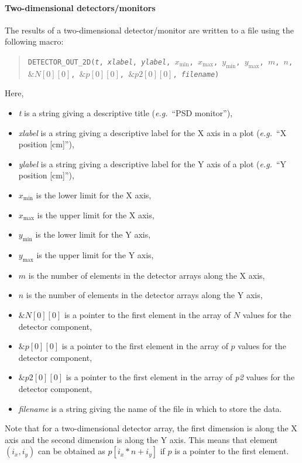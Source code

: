 \paragraph{Two-dimensional detectors/monitors}

The results of a two-dimensional detector/\discretionary{}{}{}mon\-i\-tor are written to a file using the
following macro:
\begin{quote}
  \texttt{DETECTOR\_OUT\_2D(\textit{t},
        \textit{xlabel},
        \textit{ylabel},
        $x_\mathrm{min}$, $x_\mathrm{max}$, $y_\mathrm{min}$, $y_\mathrm{max}$, $m$, $n$,\\
          $\&N[0][0]$, $\&p[0][0]$, $\&\textit{p2}[0][0]$,
        \textit{filename})}
\end{quote}
Here,
\begin{itemize}
\item \textit{t} is a string giving a descriptive title ({\em e.g.}\ ``PSD
  monitor''),
\item \textit{xlabel} is a string giving a descriptive label for the X
  axis in a plot ({\em e.g.}\ ``X position [cm]''),
\item \textit{ylabel} is a string giving a descriptive label for the Y
  axis of a plot ({\em e.g.}\ ``Y position [cm]''),
\item $x_\mathrm{min}$ is the lower limit for the X axis,
\item $x_\mathrm{max}$ is the upper limit for the X axis,
\item $y_\mathrm{min}$ is the lower limit for the Y axis,
\item $y_\mathrm{max}$ is the upper limit for the Y axis,
\item $m$ is the number of elements in the detector arrays along the X axis,
\item $n$ is the number of elements in the detector arrays along the Y axis,
\item $\&N[0][0]$ is a pointer to the first element in the array of $N$
  values for the detector component,
\item $\&p[0][0]$ is a pointer to the first element in the array of $p$
  values for the detector component,
\item $\&\textit{p2}[0][0]$ is a pointer to the first element in the array of
  \textit{p2} values for the detector component,
\item \textit{filename} is a string giving the name of the file in which
  to store the data.
\end{itemize}
Note that for a two-dimensional detector array, the first dimension is
along the X axis and the second dimension is along the Y axis. This
means that element $(i_x,i_y)$ can be obtained as $p[i_x*n+i_y]$ if $p$
is a pointer to the first element.

